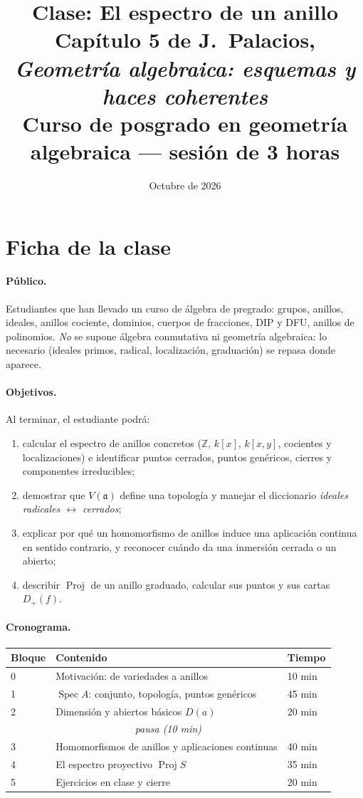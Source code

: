 \documentclass[11pt,a4paper]{article}
\title{\textbf{Clase: El espectro de un anillo}\\[4pt]
\large Capítulo 5 de J.~Palacios, \emph{Geometría algebraica: esquemas y haces coherentes}\\
Curso de posgrado en geometría algebraica --- sesión de 3 horas}
\author{}
\date{Octubre de 2026}
\newcommand{\Spec}{\operatorname{Spec}}
\newcommand{\Proj}{\operatorname{Proj}}
\newcommand{\ZZ}{\mathbb{Z}}
\newcommand{\aaa}{\mathfrak{a}}
\theoremstyle{plain}
\theoremstyle{definition}
\theoremstyle{remark}
\newcounter{ej}
\begin{document}
\maketitle

\section*{Ficha de la clase}

\paragraph{Público.} Estudiantes que han llevado un curso de álgebra de pregrado: grupos, anillos, ideales, anillos cociente, dominios, cuerpos de fracciones, DIP y DFU, anillos de polinomios. \emph{No} se supone álgebra conmutativa ni geometría algebraica: lo necesario (ideales primos, radical, localización, graduación) se repasa donde aparece.

\paragraph{Objetivos.} Al terminar, el estudiante podrá:
\begin{enumerate}[itemsep=1pt]
\item calcular el espectro de anillos concretos ($\ZZ$, $k[x]$, $k[x,y]$, cocientes y localizaciones) e identificar puntos cerrados, puntos genéricos, cierres y componentes irreducibles;
\item demostrar que $V(\aaa)$ define una topología y manejar el diccionario \emph{ideales radicales $\leftrightarrow$ cerrados};
\item explicar por qué un homomorfismo de anillos induce una aplicación continua en sentido contrario, y reconocer cuándo da una inmersión cerrada o un abierto;
\item describir $\Proj$ de un anillo graduado, calcular sus puntos y sus cartas $D_+(f)$.
\end{enumerate}

\paragraph{Cronograma.}
\begin{center}
\begin{tabular}{@{}lll@{}}
\toprule
Bloque & Contenido & Tiempo \\
\midrule
0 & Motivación: de variedades a anillos & 10 min \\
1 & $\Spec A$: conjunto, topología, puntos genéricos & 45 min \\
2 & Dimensión y abiertos básicos $D(a)$ & 20 min \\
\multicolumn{3}{c}{\emph{pausa (10 min)}} \\
3 & Homomorfismos de anillos y aplicaciones continuas & 40 min \\
4 & El espectro proyectivo $\Proj S$ & 35 min \\
5 & Ejercicios en clase y cierre & 20 min \\
\bottomrule
\end{tabular}
\end{center}
\end{document}

